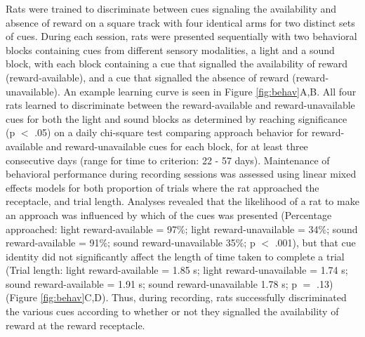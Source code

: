 \documentclass[11pt]{article}
\begin{document}
Rats were trained to discriminate between cues signaling the availability and absence of reward on a square track with four identical arms for two distinct sets of cues. During each session, rats were presented sequentially with two behavioral blocks containing cues from different sensory modalities, a light and a sound block, with each block containing a cue that signalled the availability of reward (reward-available), and a cue that signalled the absence of reward (reward-unavailable). An example learning curve is seen in Figure \ref{fig:behav}A,B. All four rats learned to discriminate between the reward-available and reward-unavailable cues for both the light and sound blocks as determined by reaching significance (p $<$ .05) on a daily chi-square test comparing approach behavior for reward-available and reward-unavailable cues for each block, for at least three consecutive days (range for time to criterion: 22 - 57 days). Maintenance of behavioral performance during recording sessions was assessed using linear mixed effects models for both proportion of trials where the rat approached the receptacle, and trial length. Analyses revealed that the likelihood of a rat to make an approach was influenced by which of the cues was presented (Percentage approached: light reward-available = 97\%; light reward-unavailable = 34\%; sound reward-available = 91\%; sound reward-unavailable 35\%; p $<$ .001), but that cue identity did not significantly affect the length of time taken to complete a trial (Trial length: light reward-available = 1.85 s; light reward-unavailable = 1.74 s; sound reward-available = 1.91 s; sound reward-unavailable 1.78 s; p $=$ .13)(Figure \ref{fig:behav}C,D). Thus, during recording, rats successfully discriminated the various cues according to whether or not they signalled the availability of reward at the reward receptacle.
\end{document}
